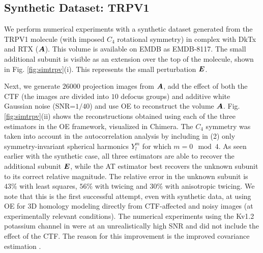 \subsection{Synthetic Dataset: TRPV1}

We perform numerical experiments with a synthetic dataset generated from the 
TRPV1 molecule (with imposed $C_4$ rotational symmetry) in complex with DkTx and RTX ($\boldsymbol{A}$). This volume is available on EMDB 
as EMDB-8117. The small additional subunit is visible as an extension over the 
top of the molecule, shown in Fig. \ref{fig:simtrpv}(i). This represents the 
small perturbation $\boldsymbol{E}$. 

Next, we generate $26000$ projection images from $\boldsymbol{A}$, add 
the effect of both the CTF (the images are divided into $10$ defocus groups) and additive white Gaussian noise (SNR=$1/40$) and use OE 
to reconstruct the volume $\boldsymbol{A}$. Fig. \ref{fig:simtrpv}(ii) 
shows the reconstructions obtained using each of the three estimators in the OE 
framework, visualized in Chimera. The $C_4$ symmetry was taken into account in the autocorrelation analysis by including in (2) only symmetry-invariant spherical harmonics $Y_l^m$ for which $m=0\mod4$. As seen earlier with the synthetic case, all 
three estimators are able to recover the additional subunit $\boldsymbol{E}$, while the AT 
estimator best recovers the unknown subunit to its correct relative magnitude. 
The relative error in the unknown subunit is $43\%$ with least squares, 
$56\%$ with twicing and $30\%$ with anisotropic twicing. We note that 
this is the first successful attempt, even with synthetic data, at using OE for 
3D homology modeling directly from CTF-affected and noisy images (at experimentally relevant conditions). The numerical 
experiments using the Kv1.2 potassium channel in \cite{Bhamre2014} were at an unrealistically high SNR and did not include the effect of the CTF. The 
reason for this improvement is the improved covariance estimation 
\cite{Bhamre2016}.


